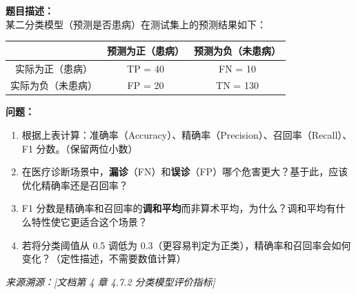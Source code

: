 \documentclass[a4paper,11pt]{ctexart}
\begin{document}
\begin{problembox}
    \textbf{题目描述：}\\
    某二分类模型（预测是否患病）在测试集上的预测结果如下：

    \begin{center}
    \begin{tabular}{ccc}
        \toprule
        & 预测为正（患病） & 预测为负（未患病） \\
        \midrule
        实际为正（患病） & TP = 40 & FN = 10 \\
        实际为负（未患病） & FP = 20 & TN = 130 \\
        \bottomrule
    \end{tabular}
    \end{center}

    \textbf{问题：}
    \begin{enumerate}[(1)]
        \item 根据上表计算：准确率（Accuracy）、精确率（Precision）、召回率（Recall）、F1 分数。（保留两位小数）

        \item 在医疗诊断场景中，\textbf{漏诊}（FN）和\textbf{误诊}（FP）哪个危害更大？基于此，应该优化精确率还是召回率？

        \item F1 分数是精确率和召回率的\textbf{调和平均}而非算术平均，为什么？调和平均有什么特性使它更适合这个场景？

        \item 若将分类阈值从 0.5 调低为 0.3（更容易判定为正类），精确率和召回率会如何变化？（定性描述，不需要数值计算）
    \end{enumerate}
    {\color{gray}\small\textit{来源溯源：[文档第 4 章 4.7.2 分类模型评价指标]}}
\end{problembox}
\end{document}
